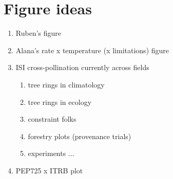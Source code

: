 \documentclass[11pt,letter]{article}
\begin{document}
\section{Figure ideas}

\begin{enumerate}
\item Ruben's figure
\item Alana's rate x temperature (x limitations) figure
\item ISI cross-pollination currently across fields
\begin{enumerate}
\item tree rings in climatology
\item tree rings in ecology
\item constraint folks
\item forestry plots (provenance trials)
\item experiments ... 
\end{enumerate}
\item PEP725 x ITRB plot
\end{enumerate}
\end{document}
